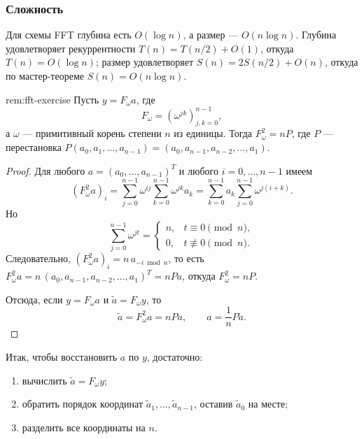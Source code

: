 \subsubsection*{Сложность}

Для схемы FFT глубина есть $O(\log n)$, а размер — $O(n\log n)$.
Глубина удовлетворяет рекуррентности $T(n)=T(n/2)+O(1)$, откуда $T(n)=O(\log n)$;
размер удовлетворяет $S(n)=2S(n/2)+O(n)$, откуда по мастер-теореме $S(n)=O(n\log n)$.

\begin{Proposition}{}{rem:fft-exercise}
	Пусть $y = F_{\omega} a$, где
	\[
	F_\omega = (\omega^{jk})_{j,k=0}^{n-1},
	\]
	а $\omega$ — примитивный корень степени $n$ из единицы.
	Тогда $F_\omega^2 = nP$,
	где $P$ — перестановка $P(a_0,a_1,\dots,a_{n-1}) = (a_0,a_{n-1},a_{n-2},\dots,a_1)$.
\end{Proposition}

\begin{proof}
	Для любого $a=(a_0,\dots,a_{n-1})^T$ и любого $i=0,\dots,n-1$ имеем
	\[
	(F_\omega^2 a)_i
	=
	\sum_{j=0}^{n-1}\omega^{ij}\sum_{k=0}^{n-1}\omega^{jk}a_k
	=
	\sum_{k=0}^{n-1} a_k \sum_{j=0}^{n-1}\omega^{j(i+k)}.
	\]
	Но
	\[
	\sum_{j=0}^{n-1}\omega^{jt}
	=
	\begin{cases}
		n, & t \equiv 0 \pmod n,\\
		0, & t \not\equiv 0 \pmod n.
	\end{cases}
	\]
	Следовательно, $(F_\omega^2 a)_i = n\,a_{-i \bmod n}$, то есть
	$F_\omega^2 a = n\,(a_0,a_{n-1},a_{n-2},\dots,a_1)^T = nPa$, откуда $F_\omega^2 = nP$.
	
	Отсюда, если $y=F_\omega a$ и $\tilde a = F_\omega y$, то
	\[
	\tilde a = F_\omega^2 a = nPa,
	\qquad
	a = \frac1n P\tilde a.
	\]
\end{proof}

Итак, чтобы восстановить $a$ по $y$, достаточно:
\begin{enumerate}
	\item вычислить $\tilde a = F_\omega y$;
	\item обратить порядок координат $\tilde a_1,\dots,\tilde a_{n-1}$, оставив $\tilde a_0$ на месте;
	\item разделить все координаты на $n$.
\end{enumerate}